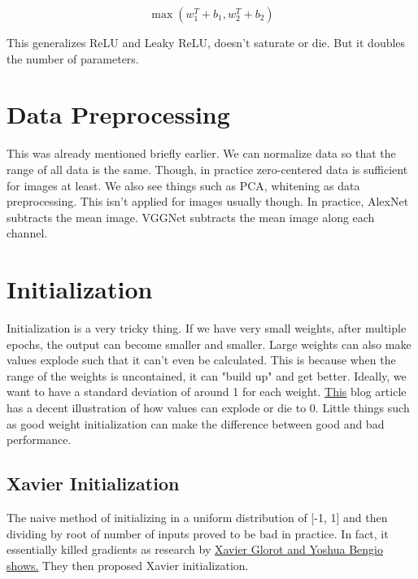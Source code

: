 \begin{equation}
    \max (w_1^T + b_1, w_2^T + b_2)
\end{equation}

This generalizes ReLU and Leaky ReLU, doesn't saturate or die.
But it doubles the number of parameters.

\section{Data Preprocessing}

This was already mentioned briefly earlier. We can normalize data so that the range of all data is the same. Though, in practice zero-centered data is sufficient for images at least. We also see things such as PCA, whitening as data preprocessing. This isn't applied for images usually though. In practice, AlexNet subtracts the mean image. VGGNet subtracts the mean image along each channel.  

\section{Initialization}

Initialization is a very tricky thing. If we have very small weights, after multiple epochs, the output can become smaller and smaller. Large weights can also make values explode such that it can't even be calculated. This is because when the range of the weights is uncontained, it can "build up" and get better. Ideally, we want to have a standard deviation of around 1 for each weight. \href{https://towardsdatascience.com/weight-initialization-in-neural-networks-a-journey-from-the-basics-to-kaiming-954fb9b47c79}{This} blog article has a decent illustration of how values can explode or die to 0. Little things such as good weight initialization can make the difference between good and bad performance.

\subsection{Xavier Initialization}

The naive method of initializing in a uniform distribution of [-1, 1] and then dividing by root of number of inputs proved to be bad in practice. In fact, it essentially killed gradients as research by \href{http://proceedings.mlr.press/v9/glorot10a/glorot10a.pdf}{Xavier Glorot and Yoshua Bengio shows.} They then proposed Xavier initialization.

